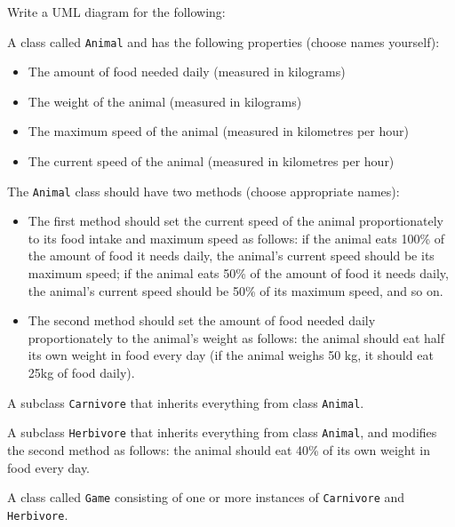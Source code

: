 Write a UML diagram for the following:

A class called \texttt{Animal} and has the following properties (choose names yourself): 
\begin{itemize}
\item The amount of food needed daily (measured in kilograms)
\item The weight of the animal (measured in kilograms)
\item The maximum speed of the animal (measured in kilometres per hour)
\item The current speed of the animal (measured in kilometres per hour)
\end{itemize}
The \texttt{Animal} class should have two methods (choose appropriate names):
\begin{itemize}
\item The first method should set the current speed of the animal proportionately to its food intake and maximum speed as follows: if the animal eats 100\% of the amount of food it needs daily, the animal's current speed should be its maximum speed; if the animal eats 50\% of the amount of food it needs daily, the animal's current speed should be 50\% of its maximum speed, and so on.
\item The second method should set the amount of food needed daily proportionately to the animal's weight as follows: the animal should eat half its own weight in food every day (if the animal weighs 50 kg, it should eat 25kg of food daily).
\end{itemize}

A subclass \texttt{Carnivore} that inherits everything from class \texttt{Animal}.

A subclass \texttt{Herbivore} that inherits everything from class \texttt{Animal}, and modifies the second method as follows: the animal should eat 40\% of its own weight in food every day.

A class called \texttt{Game} consisting of one or more instances of \texttt{Carnivore} and \texttt{Herbivore}.